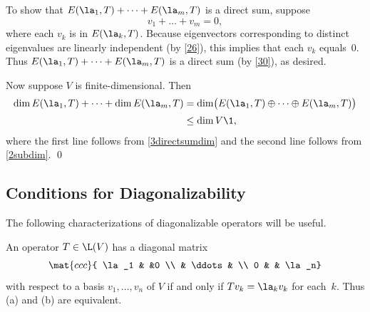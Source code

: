 \proof
To show that $E(\la_1, T) + \dots + E(\la_m, T)$ is a direct sum, suppose
\vspace{-1bp} %
\[
v_1 + \dots + v_m = 0,
\]
\vspace{-1bp}%
where each $v_k$ is in $E(\la_k, T)$.  Because eigenvectors corresponding to distinct eigenvalues are linearly
independent (by \ref{26}), this implies that each $v_k$
equals~$0$.  Thus $E(\la_1, T) + \dots + E(\la_m, T)$ is a direct sum (by \ref{30}), as desired.

Now suppose $V$ is finite-dimensional. Then
\begin{align*}
\dim E(\la_1, T) + \dots + \dim E(\la_m, T) &= \dim \bigl(E(\la_1, T) \oplus \dots \oplus  E(\la_m, T) \bigr)\\[2bp]
&\le \dim V\1,
\end{align*}
where the first line follows from \ref{3directsumdim} and the second line follows from \ref{2subdim}.
\qed%

\subsection{Conditions for Diagonalizability}

The following characterizations of diagonalizable operators will be useful.


\proof
An operator $T \in \L(V)$ has a diagonal matrix
\[
\mat{ccc}{
\la_1 & &0 \\
& \ddots & \\
0 & & \la_n}
\]
with respect to a basis $v_1, \dots, v_n$ of $V$ if and only if $Tv_k = \la_k v_k$ for each~$k$. Thus (a) and (b) are equivalent.

